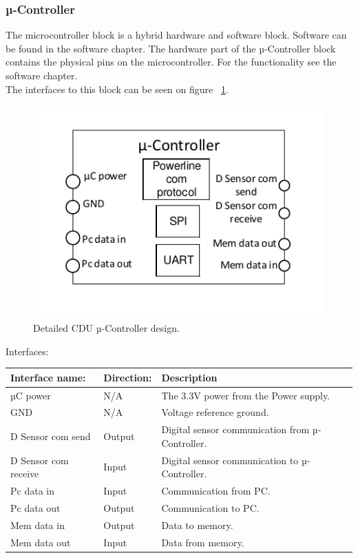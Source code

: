 \subsubsection{µ-Controller}
The microcontroller block is a hybrid hardware and software block. Software can be found in the software chapter. The hardware part of the µ-Controller block contains the physical pins on the microcontroller. For the functionality see the software chapter.\\
The interfaces to this block can be seen on figure ~\ref{fig:CDUuC}.\\
\begin{figure}[H]
	\centering
	\includegraphics[scale=1]{billeder/CDUuC}
	\caption{Detailed CDU µ-Controller design.}
	\label{fig:CDUuC}
\end{figure}
Interfaces:
\begin{table}[H]
	\centering
	\begin{tabular}{|p{3cm} |p{3cm}| p{8cm}| }
		\hline
		Interface name: & Direction: 	& Description \\ \hline
		µC power	  &N/A & The 3.3V power from the Power supply. \\ \hline
		GND				&N/A & Voltage reference ground. \\\hline 
		D Sensor com send & Output	& Digital sensor communication from µ-Controller. \\\hline 
		D Sensor com receive & Input	& Digital sensor communication to µ-Controller. \\\hline
		Pc data in		&Input & Communication from PC. \\\hline 
		Pc data out		&Output & Communication to PC. \\\hline
		Mem data in		&Output & Data to memory. \\\hline 
		Mem data out	&Input & Data from memory. \\\hline  
	\end{tabular}
\end{table}


